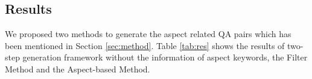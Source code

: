 %
%
%

\subsection{Results}
We proposed two methods to generate the aspect related QA pairs which has been mentioned in Section \ref{sec:method}.
Table \ref{tab:res} shows the results of two-step generation framework without the information of aspect keywords, the Filter Method and the Aspect-based Method.

%

